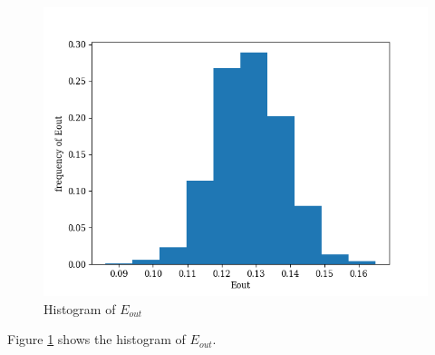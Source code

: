 \documentclass[12pt,a4paper]{article}
\begin{document}
\section{} %

\begin{figure}[h!]
	\centering
	\includegraphics[width=\linewidth]{code/q7.png}
	\caption{Histogram of ${E}_{out}$}
	\label{fig:q7}
\end{figure}

Figure \ref{fig:q7} shows the histogram of ${E}_{out}$.


\section{} %

\section{} %
\end{document}
